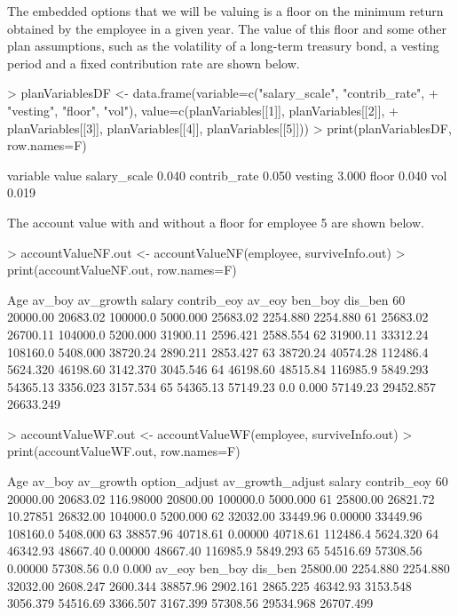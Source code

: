\documentclass[12pt]{article}
\begin{document}
The embedded options that we will be valuing is a floor on the minimum
return obtained by the employee in a given year. The value of this floor 
and some other plan assumptions, such as the volatility of a long-term treasury
bond, a vesting period and a fixed contribution rate are shown below.
\begin{Schunk}
\begin{Sinput}
> planVariablesDF <- data.frame(variable=c("salary_scale", "contrib_rate", 
+   "vesting", "floor", "vol"), value=c(planVariables[[1]], planVariables[[2]],
+   planVariables[[3]], planVariables[[4]], planVariables[[5]]))
> print(planVariablesDF, row.names=F)
\end{Sinput}
\begin{Soutput}
     variable value
 salary_scale 0.040
 contrib_rate 0.050
      vesting 3.000
        floor 0.040
          vol 0.019
\end{Soutput}
\end{Schunk}

The account value with and without a floor for employee 5 are shown below.
\begin{Schunk}
\begin{Sinput}
> accountValueNF.out <- accountValueNF(employee, surviveInfo.out)
> print(accountValueNF.out, row.names=F)
\end{Sinput}
\begin{Soutput}
 Age   av_boy av_growth   salary contrib_eoy   av_eoy   ben_boy   dis_ben
  60 20000.00  20683.02 100000.0    5000.000 25683.02  2254.880  2254.880
  61 25683.02  26700.11 104000.0    5200.000 31900.11  2596.421  2588.554
  62 31900.11  33312.24 108160.0    5408.000 38720.24  2890.211  2853.427
  63 38720.24  40574.28 112486.4    5624.320 46198.60  3142.370  3045.546
  64 46198.60  48515.84 116985.9    5849.293 54365.13  3356.023  3157.534
  65 54365.13  57149.23      0.0       0.000 57149.23 29452.857 26633.249
\end{Soutput}
\begin{Sinput}
> accountValueWF.out <- accountValueWF(employee, surviveInfo.out)
> print(accountValueWF.out, row.names=F)
\end{Sinput}
\begin{Soutput}
 Age   av_boy av_growth option_adjust av_growth_adjust   salary contrib_eoy
  60 20000.00  20683.02     116.98000         20800.00 100000.0    5000.000
  61 25800.00  26821.72      10.27851         26832.00 104000.0    5200.000
  62 32032.00  33449.96       0.00000         33449.96 108160.0    5408.000
  63 38857.96  40718.61       0.00000         40718.61 112486.4    5624.320
  64 46342.93  48667.40       0.00000         48667.40 116985.9    5849.293
  65 54516.69  57308.56       0.00000         57308.56      0.0       0.000
   av_eoy   ben_boy   dis_ben
 25800.00  2254.880  2254.880
 32032.00  2608.247  2600.344
 38857.96  2902.161  2865.225
 46342.93  3153.548  3056.379
 54516.69  3366.507  3167.399
 57308.56 29534.968 26707.499
\end{Soutput}
\end{Schunk}
\end{document}
